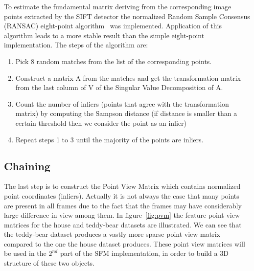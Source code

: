To estimate the fundamental matrix deriving from the corresponding image points extracted by the SIFT detector the normalized Random Sample Consensus (RANSAC) eight-point algorithm~\cite{eight-point} was implemented. Application of this algorithm leads to a more stable result than the simple eight-point implementation. The steps of the algorithm are:

\begin{enumerate}[1]
  \item Pick 8 random matches from the list of the corresponding points.
  \item Construct a matrix A from the matches and get the transformation matrix from the last column of V of the Singular Value Decomposition of A.
  \item Count the number of inliers (points that agree with the transformation matrix) by computing the Sampson distance (if distance is smaller than a certain threshold then we consider the point as an inlier)
  \item Repeat steps 1 to 3 until the majority of the points are inliers.
\end{enumerate}


\subsection{Chaining}
The last step is to construct the Point View Matrix which contains normalized point coordinates (inliers). Actually it is not always the case that many points are present in all frames due to the fact that the frames may have considerably large difference in view among them. In figure~\ref{fig:pvm} the feature point view matrices for the house and teddy-bear datasets are illustrated. We can see that the teddy-bear dataset produces a vastly more sparse point view matrix compared to the one the house dataset produces. These point view matrices will be used in the $2^{nd}$ part of the SFM implementation, in order to build a 3D structure of these two objects.



